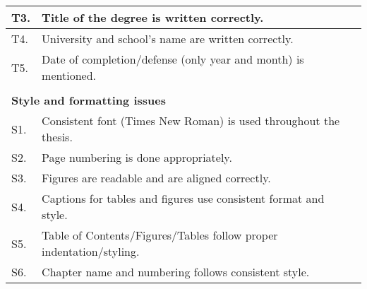 \begin{table}[!ht]
\begin{adjustbox}{width=\linewidth,center}
\begin{tabular}{p{0.6cm}p{9cm}p{0.6cm}}
\multicolumn{1}{|l|}{T3.} & \multicolumn{1}{l|}{Title of the degree   is written correctly.}                                                                     & \multicolumn{1}{l|}{} \\ \midrule
\multicolumn{1}{|l|}{T4.} & \multicolumn{1}{l|}{University and   school's name are written correctly.}                                                           & \multicolumn{1}{l|}{} \\ \midrule
\multicolumn{1}{|l|}{T5.} & \multicolumn{1}{l|}{Date of   completion/defense (only year and month) is mentioned.}                                                & \multicolumn{1}{l|}{} \\ \midrule
                          &                                                                                                                                      &                       \\ \midrule
\multicolumn{3}{|l|}{\textbf{Style and formatting issues}}                                                                                                                               \\ \midrule
\multicolumn{1}{|l|}{S1.} & \multicolumn{1}{l|}{Consistent font (Times New Roman) is   used throughout the thesis.}                                              & \multicolumn{1}{l|}{} \\ \midrule
\multicolumn{1}{|l|}{S2.} & \multicolumn{1}{l|}{Page numbering is   done appropriately.}                                                                         & \multicolumn{1}{l|}{} \\ \midrule
\multicolumn{1}{|l|}{S3.} & \multicolumn{1}{l|}{Figures are readable   and are aligned correctly.}                                                               & \multicolumn{1}{l|}{} \\ \midrule
\multicolumn{1}{|l|}{S4.} & \multicolumn{1}{l|}{Captions for tables   and figures use consistent format and style.}                                              & \multicolumn{1}{l|}{} \\ \midrule
\multicolumn{1}{|l|}{S5.} & \multicolumn{1}{l|}{Table of   Contents/Figures/Tables follow proper indentation/styling.}                                           & \multicolumn{1}{l|}{} \\ \midrule
\multicolumn{1}{|l|}{S6.} & \multicolumn{1}{l|}{Chapter name and   numbering follows consistent style.}                                                          & \multicolumn{1}{l|}{} \\ \midrule

\end{tabular}
\end{adjustbox}
\end{table}
